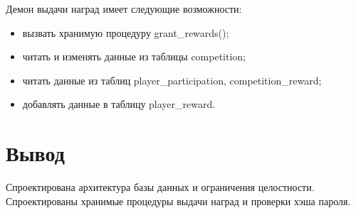 Демон выдачи наград имеет следующие возможности:
\begin{itemize}
	\item вызвать хранимую процедуру grant\_rewards();
	\item читать и изменять данные из таблицы competition;
	\item читать данные из таблиц player\_participation, competition\_reward;
	\item добавлять данные в таблицу player\_reward.
\end{itemize}


\section*{Вывод}

Спроектирована архитектура базы данных и ограничения целостности. Спроектированы хранимые процедуры выдачи наград и проверки хэша пароля.
\clearpage
